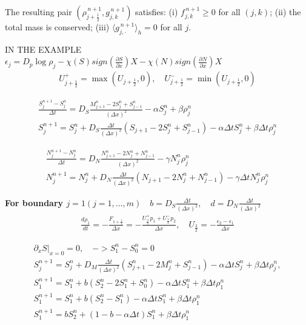 \documentclass[11pt,twoside]{article}
\theoremstyle{plain}
\theoremstyle{nonumberplain}
\begin{document}
The resulting pair $(\rho_{j+\frac12}^{\,n+1}, g_{j,k}^{\,n+1})$ satisfies:
(i) $f_{j,k}^{\,n+1}\ge 0$ for all $(j,k)$;  
(ii) the total mass is conserved;  
(iii) $\langle g_{j,\cdot}^{\,n+1}\rangle_h = 0$ for all $j$.

\iffalse
IN THE EXAMPLE\\
$\epsilon_j=D_p \log \rho_j-\chi(S) sign(\frac{\partial S}{\partial x})X-\chi(N) sign(\frac{\partial N}{\partial x})X$
\begin{eqnarray}
U^+_{j+\frac{1}{2}}=\max(U_{j+\frac{1}{2}},0), \quad U^-_{j+\frac{1}{2}}=\min (U_{j+\frac{1}{2}},0)
\end{eqnarray}

\begin{eqnarray}
\frac{S_j^{n+1}-S_j^n}{\Delta t}=D_S\frac{M_{j+1}^n-2S_j^n+S_{j-1}^n}{(\Delta x)^2}-\alpha S_j^n+\beta \rho_j^n\\
S_j^{n+1}=S_j^n+D_S \frac{\Delta t} {(\Delta x)^2}(S_{j+1}-2S_j^n+S_{j-1}^n)-\alpha \Delta t S_j^n+\beta \Delta t \rho_j^n
\end{eqnarray}


\begin{eqnarray}
\frac{N_j^{n+1}-N_j^n}{\Delta t}=D_N\frac{N_{j+1}^n-2N_j^n+N_{j-1}^n}{(\Delta x)^2}-\gamma N_j^n \rho_j^n\\
N_j^{n+1}=N_j^n+D_N \frac{\Delta t} {(\Delta x)^2}(N_{j+1}-2N_j^n+N_{j-1}^n)-\gamma \Delta t N_j^n \rho_j^n
\end{eqnarray}

\textbf{ For boundary $ j=1(j=1,...,m) \quad b=D_S \frac{\Delta t} {(\Delta x)^2}, \quad d=D_N \frac{\Delta t} {(\Delta x)^2}$}
\begin{eqnarray}
\frac{d\rho_1}{dt}=-\frac{F_{1+\frac{1}{2}}}{\Delta x}=-\frac{U^+_{\frac{3}{2}}p_1+U^-_{\frac{3}{2}}p_2 }{\Delta x}, \quad U_{\frac{3}{2}}=-\frac{\epsilon_2-\epsilon_1}{\Delta x}
\end{eqnarray}

 
\begin{eqnarray}
\partial_x S |_{x=0}= 0, \quad -> S^n_1-S^n_0=0\\
S_j^{n+1}=S_j^n+D_M \frac{\Delta t} {(\Delta x)^2}(S^n_{j+1}-2M_j^n+S_{j-1}^n)-\alpha \Delta t S_j^n+\beta \Delta t \rho_j^n, \\
S_1^{n+1}=S_1^n+b(S^n_{2}-2S_1^n+S_{0}^n)-\alpha \Delta t S_1^n+\beta \Delta t \rho_1^n\\
S_1^{n+1}=S_1^n+b(S^n_{2}-S_1^n)-\alpha \Delta t S_1^n+\beta \Delta t \rho_1^n\\
S_1^{n+1}=bS^n_2+(1-b-\alpha \Delta t)S_1^n+\beta \Delta t \rho_1^n
\end{eqnarray}
\end{document}
